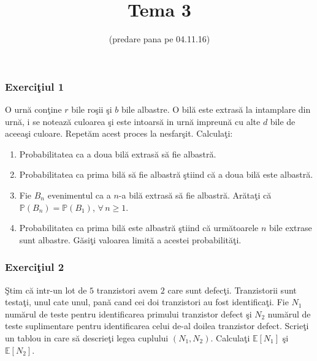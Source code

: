 \documentclass[]{article}
\title{Tema 3}
\subtitle{(predare pana pe 04.11.16)}
\author{}
\date{}
\def\PP{{\mathbb P}}
\def\EE{{\mathbb E}}
\begin{document}
\maketitle

\thispagestyle{fancy}

\subsubsection{\texorpdfstring{Exerci\c tiul
1}{Exerciiul 1}}\label{exerciiul-1}

O urn\u a con\c tine \(r\) bile ro\c sii \c si \(b\) bile albastre. O
bil\u a este extras\u a la intamplare din urn\u a, i se noteaz\u a
culoarea \c si este intoars\u a in urn\u a impreun\u a cu alte \(d\)
bile de aceea\c si culoare. Repet\u am acest proces la nesfar\c sit.
Calcula\c ti:

\begin{enumerate}
\def\labelenumi{\alph{enumi})}
\item
  Probabilitatea ca a doua bil\u a extras\u a s\u a fie albastr\u a.
\item
  Probabilitatea ca prima bil\u a s\u a fie albastr\u a \c stiind c\u a
  a doua bil\u a este albastr\u a.
\item
  Fie \(B_n\) evenimentul ca a \(n\)-a bil\u a extras\u a s\u a fie
  albastr\u a. Ar\u ata\c ti c\u a \(\PP(B_n)=\PP(B_1)\),
  \(\forall\, n\geq1\).
\item
  Probabilitatea ca prima bil\u a este albastr\u a \c stiind c\u a
  urm\u atoarele \(n\) bile extrase sunt albastre. G\u asi\c ti valoarea
  limit\u a a acestei probabilit\u a\c ti.
\end{enumerate}

\subsubsection{\texorpdfstring{Exerci\c tiul
2}{Exerciiul 2}}\label{exerciiul-2}

\c Stim c\u a intr-un lot de \(5\) tranzistori avem \(2\) care sunt
defec\c ti. Tranzistorii sunt testa\c ti, unul cate unul, pan\u a cand
cei doi tranzistori au fost identifica\c ti. Fie \(N_1\) num\u arul de
teste pentru identificarea primului tranzistor defect \c si \(N_2\)
num\u arul de teste suplimentare pentru identificarea celui de-al doilea
tranzistor defect. Scrie\c ti un tablou in care s\u a descrie\c ti legea
cuplului \((N_1,N_2)\). Calcula\c ti \(\EE[N_1]\) \c si \(\EE[N_2]\).
\end{document}
